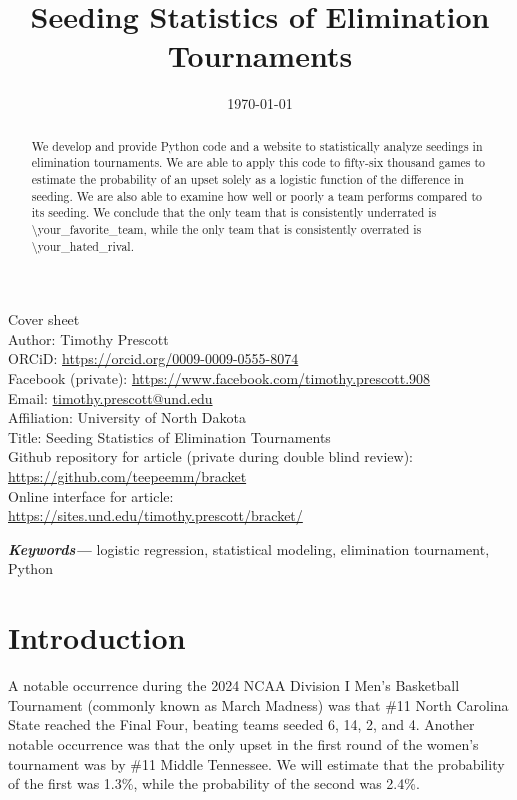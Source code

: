 \documentclass{article}
\title{Seeding Statistics of Elimination Tournaments}
\author{\authorinfo}
\date{\today}
\begin{document}
\noindent
Cover sheet\\
Author: Timothy Prescott\\
ORCiD: \url{https://orcid.org/0009-0009-0555-8074}\\
Facebook (private): \url{https://www.facebook.com/timothy.prescott.908}\\
Email: \url{timothy.prescott@und.edu}\\
Affiliation: University of North Dakota\\
Title: Seeding Statistics of Elimination Tournaments\\
Github repository for article (private during double blind review):\\
\url{https://github.com/teepeemm/bracket}\\
Online interface for article:\\
\url{https://sites.und.edu/timothy.prescott/bracket/}

\clearpage

\maketitle

\tableofcontents

\begin{abstract}\noindent
We develop and provide Python code and a website to statistically analyze seedings in elimination tournaments.  We are able to apply this code to fifty-six thousand games to estimate the probability of an upset solely as a logistic function of the difference in seeding.  We are also able to examine how well or poorly a team performs compared to its seeding.  We conclude that the only team that is consistently underrated is \textbackslash your\_favorite\_team, while the only team that is consistently overrated is \textbackslash your\_hated\_rival.
\end{abstract}

\noindent
{\small\textbf{\textit{Keywords---}} logistic regression, statistical modeling, elimination tournament, Python}

\section{Introduction}
A notable occurrence during the 2024 NCAA Division I Men's Basketball Tournament (commonly known as March Madness) was that \#11 North Carolina State reached the Final Four, beating teams seeded 6, 14, 2, and 4.  Another notable occurrence was that the only upset in the first round of the women's tournament was by \#11 Middle Tennessee.  We will estimate that the probability of the first was 1.3\%, while the probability of the second was 2.4\%.
\end{document}
